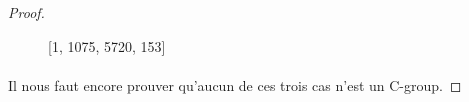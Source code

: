 \begin{proof}
\begin{figure}[H]
\begin{center}
\begin{tikzpicture}
      \end{tikzpicture}
      \caption{[1, 1075, 5720, 153]}
    \end{center}
  \end{figure}

  \paragraph{}
  Il nous faut encore prouver qu'aucun de ces trois cas n'est un C-group.


\end{proof}
